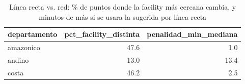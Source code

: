 \begin{table}
\caption{Línea recta vs. red: \% de puntos donde la facility más cercana cambia, y minutos de más si se usara la sugerida por línea recta}
\label{tab:straight_line_vs_network}
\begin{tabular}{lrr}
\toprule
departamento & pct\_facility\_distinta & penalidad\_min\_mediana \\
\midrule
amazonico & 47.6 & 1.0 \\
andino & 13.0 & 13.4 \\
costa & 46.2 & 2.5 \\
\bottomrule
\end{tabular}
\end{table}
